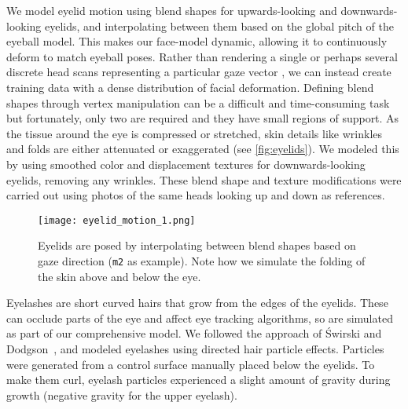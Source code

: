 We model eyelid motion using blend shapes for upwards-looking and downwards-looking eyelids, and interpolating between them based on the global pitch of the eyeball model.
This makes our face-model dynamic, allowing it to continuously deform to match eyeball poses.
Rather than rendering a single or perhaps several discrete head scans representing a particular gaze vector \cite{sugano2014learning}, we can instead create training data with a dense distribution of facial deformation.
Defining blend shapes through vertex manipulation can be a difficult and time-consuming task but fortunately, only two are required and they have small regions of support.
As the tissue around the eye is compressed or stretched, skin details like wrinkles and folds are either attenuated or exaggerated (see \autoref{fig:eyelids}).
We modeled this by using smoothed color and displacement textures for downwards-looking eyelids, removing any wrinkles.
These blend shape and texture modifications were carried out using photos of the same heads looking up and down as references.

\begin{figure}
    \texttt{[image: eyelid\_motion\_1.png]} \par \smallskip
    \caption{Eyelids are posed by interpolating between blend shapes based on gaze direction (\texttt{m2} as example). Note how we simulate the folding of the skin above and below the eye.}
    \label{fig:eyelids}
\end{figure}

Eyelashes are short curved hairs that grow from the edges of the eyelids.
These can occlude parts of the eye and affect eye tracking algorithms, so are simulated as part of our comprehensive model.
We followed the approach of {\'S}wirski and Dodgson~\cite{swirski2014rendering}, and modeled eyelashes using directed hair particle effects.
Particles were generated from a control surface manually placed below the eyelids.
To make them curl, eyelash particles experienced a slight amount of gravity during growth (negative gravity for the upper eyelash).